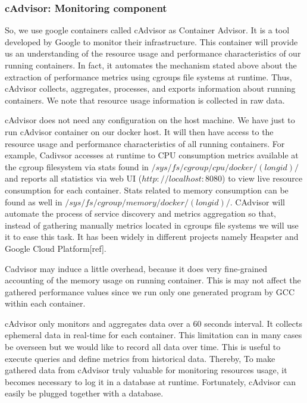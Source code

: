 \subsubsection{cAdvisor: Monitoring component}
So, we use google containers called cAdvisor as Container Advisor. It is a tool developed by Google to monitor their infrastructure. This container will provide us an understanding of the resource usage and performance characteristics of our running containers. In fact, it automates the mechanism stated above about the extraction of performance metrics using cgroups file systems at runtime. Thus, cAdvisor collects, aggregates, processes, and exports information about running containers. We note that resource usage information is collected in raw data.

cAdvisor does not need any configuration on the host machine. We have just to run cAdvisor container on our docker host. It will then have access to the resource usage and performance characteristics of all running containers. For example, Cadivsor accesses at runtime to CPU consumption metrics available at the cgroup filesystem via stats found in $/sys/fs/cgroup/cpu/docker/(longid)/$ and reports all statistics via web UI ($http://localhost:8080$) to view live resource consumption for each container. Stats related to memory consumption can be found as well in $/sys/fs/cgroup/memory/docker/(longid)/$. CAdvisor will automate the process of service discovery and metrics aggregation so that, instead of gathering manually metrics located in cgroups file systems we will use it to ease this task. It has been widely in different projects namely Heapster and Google Cloud Platform[ref].

Cadvisor may induce a little overhead, because it does very fine-grained accounting of the memory usage on running container. This is may not affect the gathered performance values since we run only one generated program by GCC within each container.

cAdvisor only monitors and aggregates data over a 60 seconds interval. It collects ephemeral data in real-time for each container. This limitation can in many cases be overseen but we would like to record all data over time. This is useful to execute queries and define metrics from historical data. Thereby, To make gathered data from cAdvisor truly valuable for monitoring resources usage, it becomes necessary to log it in a database at runtime. Fortunately, cAdvisor can easily be plugged together with a database.
